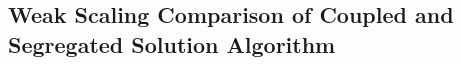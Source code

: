 
\subsection{Weak Scaling Comparison of Coupled and Segregated Solution Algorithm}
\label{sec:weakscaling}

